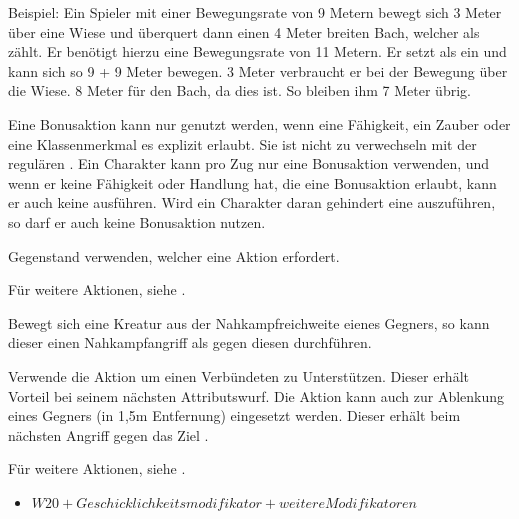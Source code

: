 Beispiel: Ein Spieler mit einer Bewegungsrate von 9 Metern bewegt sich 3 Meter über eine Wiese und überquert dann einen 4 Meter breiten Bach, welcher als  zählt. Er benötigt hierzu eine Bewegungsrate von 11 Metern. Er setzt als   ein und kann sich so 9 + 9 Meter bewegen. 3 Meter verbraucht er bei der Bewegung über die Wiese. 8 Meter für den Bach, da dies  ist. So bleiben ihm 7 Meter übrig.



Eine Bonusaktion kann nur genutzt werden, wenn eine Fähigkeit, ein Zauber oder eine Klassenmerkmal es explizit erlaubt. Sie ist nicht zu verwechseln mit der regulären . Ein Charakter kann pro Zug nur eine Bonusaktion verwenden, und wenn er keine Fähigkeit oder Handlung hat, die eine Bonusaktion erlaubt, kann er auch keine ausführen. Wird ein Charakter daran gehindert eine  auszuführen, so darf er auch keine Bonusaktion nutzen.



Gegenstand verwenden, welcher eine Aktion erfordert.

Für weitere Aktionen, siehe .



Bewegt sich eine Kreatur aus der Nahkampfreichweite eienes Gegners, so kann dieser einen Nahkampfangriff als  gegen diesen durchführen.



Verwende die Aktion um einen Verbündeten zu Unterstützen. Dieser erhält Vorteil bei seinem nächsten Attributswurf. Die Aktion kann auch zur Ablenkung eines Gegners (in 1,5m Entfernung) eingesetzt werden. Dieser erhält beim nächsten Angriff gegen das Ziel .

Für weitere Aktionen, siehe .



\begin{itemize}
\item $W20 + Geschicklichkeitsmodifikator + weitere Modifikatoren$
\end{itemize}

